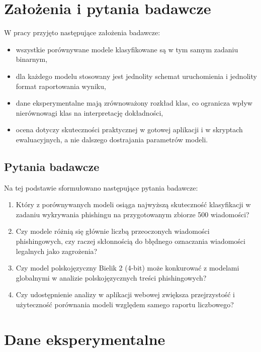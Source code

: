 \documentclass[12pt,a4paper,openright]{report}
\begin{document}
\chapter{Założenia i pytania badawcze}

W pracy przyjęto następujące założenia badawcze:

\begin{itemize}
    \item wszystkie porównywane modele klasyfikowane są w tym samym zadaniu binarnym,
    \item dla każdego modelu stosowany jest jednolity schemat uruchomienia i jednolity format raportowania wyniku,
    \item dane eksperymentalne mają zrównoważony rozkład klas, co ogranicza wpływ nierównowagi klas na interpretację dokładności,
    \item ocena dotyczy skuteczności praktycznej w gotowej aplikacji i w skryptach ewaluacyjnych, a nie dalszego dostrajania parametrów modeli.
\end{itemize}

\section{Pytania badawcze}

Na tej podstawie sformułowano następujące pytania badawcze:

\begin{enumerate}
    \item Który z porównywanych modeli osiąga najwyższą skuteczność klasyfikacji w zadaniu wykrywania phishingu na przygotowanym zbiorze 500 wiadomości?
    \item Czy modele różnią się głównie liczbą przeoczonych wiadomości phishingowych, czy raczej skłonnością do błędnego oznaczania wiadomości legalnych jako zagrożenia?
    \item Czy model polskojęzyczny Bielik 2 (4-bit) może konkurować z modelami globalnymi w analizie polskojęzycznych treści phishingowych?
    \item Czy udostępnienie analizy w aplikacji webowej zwiększa przejrzystość i użyteczność porównania modeli względem samego raportu liczbowego?
\end{enumerate}

\chapter{Dane eksperymentalne}
\end{document}
